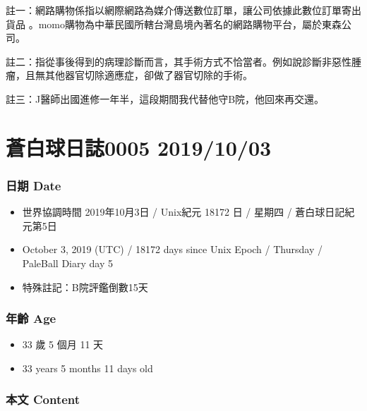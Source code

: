 \documentclass[a5paper, 12pt
]{book}
\providecommand{\tightlist}{%
  \setlength{\itemsep}{0pt}\setlength{\parskip}{0pt}}
\begin{document}
註一：網路購物係指以網際網路為媒介傳送數位訂單，讓公司依據此數位訂單寄出貨品
。momo購物為中華民國所轄台灣島境內著名的網路購物平台，屬於東森公司。

註二：指從事後得到的病理診斷而言，其手術方式不恰當者。例如說診斷非惡性腫瘤，且無其他器官切除適應症，卻做了器官切除的手術。

註三：J醫師出國進修一年半，這段期間我代替他守B院，他回來再交還。

\hypertarget{ux84bcux767dux7403ux65e5ux8a8c0005-20191003}{%
\section{蒼白球日誌0005
2019/10/03}\label{ux84bcux767dux7403ux65e5ux8a8c0005-20191003}}

\hypertarget{ux65e5ux671f-date-4}{%
\subsubsection{日期 Date}\label{ux65e5ux671f-date-4}}

\begin{itemize}
\tightlist
\item
  世界協調時間 2019年10月3日 / Unix紀元 18172 日 / 星期四 /
  蒼白球日記紀元第5日
\item
  October 3, 2019 (UTC) / 18172 days since Unix Epoch / Thursday /
  PaleBall Diary day 5
\item
  特殊註記：B院評鑑倒數15天
\end{itemize}

\hypertarget{ux5e74ux9f61-age-4}{%
\subsubsection{年齡 Age}\label{ux5e74ux9f61-age-4}}

\begin{itemize}
\tightlist
\item
  33 歲 5 個月 11 天
\item
  33 years 5 months 11 days old
\end{itemize}

\hypertarget{ux672cux6587-content-4}{%
\subsubsection{本文 Content}\label{ux672cux6587-content-4}}
\end{document}
